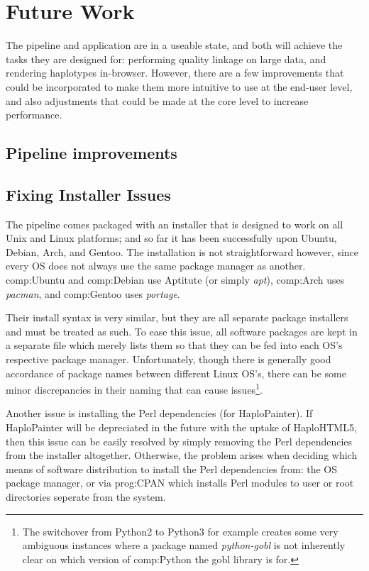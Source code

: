 \section{Future Work}

The pipeline and application are in a useable state, and both will achieve the tasks they are designed for: performing quality linkage on large data, and rendering haplotypes in-browser. However, there are a few improvements that could be incorporated to make them more intuitive to use at the end-user level, and also adjustments that could be made at the core level to increase performance.

\subsection{Pipeline improvements}

\subsection{Fixing Installer Issues}

The pipeline comes packaged with an installer that is designed to work on all Unix and Linux platforms; and so far it has been successfully upon Ubuntu, Debian, Arch, and Gentoo. The installation is not straightforward however, since every OS does not always use the same package manager as another. \gls{comp:Ubuntu} and \gls{comp:Debian} use Aptitute (or simply \textit{apt}), \gls{comp:Arch} uses \textit{pacman}, and \gls{comp:Gentoo} uses \textit{portage}.

Their install syntax is very similar, but they are all separate package installers and must be treated as such. To ease this issue, all software packages are kept in a separate file which merely lists them so that they can be fed into each OS's respective package manager. Unfortunately, though there is generally good accordance of package names between different Linux OS's, there can be some minor discrepancies in their naming that can cause issues\footnote{The switchover from Python2 to Python3 for example creates some very ambiguous instances where a package named \textit{python-gobl} is not inherently clear on which version of \gls{comp:Python} the gobl library is for.}.

Another issue is installing the Perl dependencies (for HaploPainter). If HaploPainter will be depreciated in the future with the uptake of HaploHTML5, then this issue can be easily resolved by simply removing the Perl dependencies from the installer altogether. Otherwise, the problem arises when deciding which means of software distribution to install the Perl dependencies from: the OS package manager, or via \gls{prog:CPAN} \cite{cpan} which installs Perl modules to user or root directories seperate from the system.

